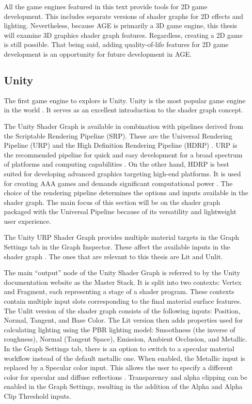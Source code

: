 \documentclass[
  digital,     %
  oneside,     %
  nosansbold,  %
  nocolorbold, %
  lof,         %
  lot,         %
]{fithesis4}
\begin{document}
All the game engines featured in this text provide tools for 2D game development. This includes separate versions
of shader graphs for 2D effects and lighting. Nevertheless, because AGE is primarily a 3D game engine, this thesis
will examine 3D graphics shader graph features. Regardless, creating a 2D game is still possible.
That being said, adding quality-of-life features for 2D game development is an opportunity
for future development in AGE.

\subsection{Unity}\label{sec:unity}
The first game engine to explore is Unity. Unity is the most popular game engine in the world \cite{slashdata-game-engines}.
It serves as an excellent introduction to the shader graph concept.

The Unity Shader Graph is available in combination with pipelines derived from the Scriptable Rendering Pipeline (SRP).
These are the Universal Rendering Pipeline (URP) and the High Definition Rendering Pipeline (HDRP) \cite{unity-srp}.
URP is the recommended pipeline for quick and easy development for a broad spectrum of platforms and computing capabilities
\cite{unity-urp}. On the other hand, HDRP is best suited for developing advanced graphics targeting high-end platforms.
It is used for creating AAA games and demands significant computational power \cite{unity-hdrp}.
The choice of the rendering pipeline determines the options and inputs available in the shader graph.
The main focus of this section will be on the shader graph packaged with the Universal Pipeline because of its versatility
and lightweight user experience.

The Unity URP Shader Graph provides multiple material targets in the Graph Settings tab in the Graph Inspector.
These affect the available inputs in the shader graph \cite{unity-graph-settings}. The ones that are relevant
to this thesis are Lit and Unlit.

The main \enquote{output} node of the Unity Shader Graph is referred to by the Unity documentation website
\cite{unity-master-stack} as the Master Stack. It is split into two contexts: Vertex and Fragment,
each representing a stage of a shader program. These contexts contain multiple input slots corresponding
to the final material surface features. The Unlit version of the shader graph consists of the following
inputs: Position, Normal, Tangent, and Base Color. The Lit version then adds properties used for
calculating lighting using the PBR lighting model: Smoothness (the inverse of roughness), Normal (Tangent Space),
Emission, Ambient Occlusion, and Metallic. In the Graph Settings tab, there is an option to switch to a specular material workflow
instead of the default metallic one. When enabled, the Metallic input is replaced by a Specular color input. This allows
the user to specify a different color for specular and diffuse reflections \cite{unity-metallic-specular}.
Transparency and alpha clipping can be enabled in the Graph Settings,
resulting in the addition of the Alpha and Alpha Clip Threshold inputs.
\end{document}
